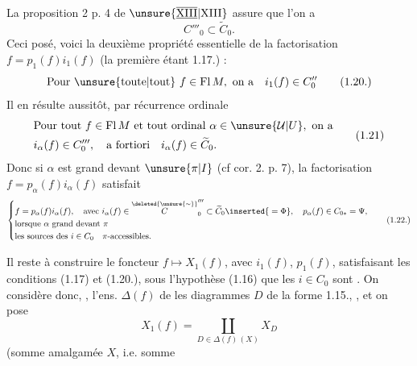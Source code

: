 La proposition 2 p. 4 de $\unsure{\overline{\underline{\mathrm{XIII}}}|\mathrm{XIII}}$ assure que l'on a
\[
C'''_0\subset\widetilde C_0.
\]
Ceci posé, voici la deuxième propriété essentielle de la factorisation $f=p_1(f)i_1(f)$ (la première étant 1.17.) :
\[
\text{Pour \unsure{toute|tout} }f\in\mathrm{Fl}\,M,\text{ on a}\quad i_1(f)\in C''_0\tag*{(1.20.)}
\]
Il en résulte aussitôt, par récurrence ordinale
\[
\begin{aligned}
&\text{Pour tout }f\in\mathrm{Fl}\,M\text{ et tout ordinal }\alpha\in\unsure{\mathcal U|U},\text{ on a}\\
&i_\alpha(f)\in C'''_0,\quad\text{a fortiori}\quad i_\alpha(f)\in\widetilde C_0.
\end{aligned}\tag*{(1.21)}
\]
Donc si $\alpha$ est grand devant $\unsure{\pi|I}$ (cf cor. 2. p.  7), la factorisation $f=p_\alpha(f)i_\alpha(f)$ satisfait
\[
\left\{\begin{aligned}
&f=p_\alpha(f)i_\alpha(f),\quad\text{avec }i_\alpha(f)\in\overset{\deleted{\unsure{\sim}}}{C}'''_0\subset\widetilde C_0\inserted{{}=\Phi},\quad p_\alpha(f)\in C_{0*}=\Psi,\\
&\text{lorsque }\alpha\text{ grand devant }\pi\\
&\text{les sources des }i\in C_0\quad\pi\text{-accessibles.}
\end{aligned}\right.\tag*{(1.22.)}
\]


Il reste à construire le foncteur $f\mapsto X_1(f)$, avec $i_1(f)$, $p_1(f)$, satisfaisant les conditions (1.17) et (1.20.), sous l'hypothèse (1.16) que les $i\in C_0$ sont . On considère donc, , l'ens. $\Delta(f)$  de  les diagrammes $D$ de la forme 1.15., , et on pose
\[
X_1(f)=\coprod_{D\in\Delta(f)\,(X)}X_D\tag*{(1.23)}
\]
(somme amalgamée  $X$, i.e. somme 
